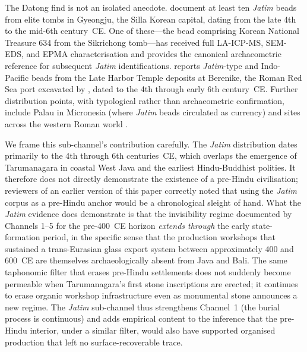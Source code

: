 \documentclass[12pt,a4paper]{article}
\begin{document}
The Datong find is not an isolated anecdote. \citet{lankton_bernbaum} document at least ten \textit{Jatim} beads from elite tombs in Gyeongju, the Silla Korean capital, dating from the late 4th to the mid-6th century~CE. One of these---the bead comprising Korean National Treasure 634 from the Sikrichong tomb---has received full LA-ICP-MS, SEM-EDS, and EPMA characterisation and provides the canonical archaeometric reference for subsequent \textit{Jatim} identifications. \citet{then2014} reports \textit{Jatim}-type and Indo-Pacific beads from the Late Harbor Temple deposits at Berenike, the Roman Red Sea port excavated by \citet{sidebotham2011}, dated to the 4th through early 6th century~CE. Further distribution points, with typological rather than archaeometric confirmation, include Palau in Micronesia (where \textit{Jatim} beads circulated as currency) and sites across the western Roman world \citep{green2018}.

We frame this sub-channel's contribution carefully. The \textit{Jatim} distribution dates primarily to the 4th through 6th centuries~CE, which overlaps the emergence of Tarumanagara in coastal West Java and the earliest Hindu-Buddhist polities. It therefore does not directly demonstrate the existence of a pre-Hindu civilisation; reviewers of an earlier version of this paper correctly noted that using the \textit{Jatim} corpus as a pre-Hindu anchor would be a chronological sleight of hand. What the \textit{Jatim} evidence does demonstrate is that the invisibility regime documented by Channels 1--5 for the pre-400~CE horizon \textit{extends through} the early state-formation period, in the specific sense that the production workshops that sustained a trans-Eurasian glass export system between approximately 400 and 600~CE are themselves archaeologically absent from Java and Bali. The same taphonomic filter that erases pre-Hindu settlements does not suddenly become permeable when Tarumanagara's first stone inscriptions are erected; it continues to erase organic workshop infrastructure even as monumental stone announces a new regime. The \textit{Jatim} sub-channel thus strengthens Channel~1 (the burial process is continuous) and adds empirical content to the inference that the pre-Hindu interior, under a similar filter, would also have supported organised production that left no surface-recoverable trace.
\end{document}
